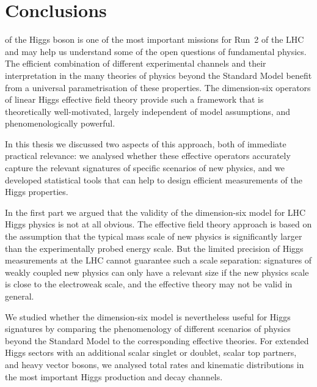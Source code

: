 
 
\chapter{Conclusions}
\label{chapter:conclusions}

 of the Higgs boson is one of
the most important missions for Run~2 of the LHC and may help us
understand some of the open questions of fundamental physics. The
efficient combination of different experimental channels and their
interpretation in the many theories of physics beyond the Standard Model
benefit from a universal parametrisation of these properties. The
dimension-six operators of linear Higgs effective field theory provide
such a framework that is theoretically well-motivated, largely
independent of model assumptions, and phenomenologically powerful.

In this thesis we discussed two aspects of this approach, both of
immediate practical relevance: we analysed whether these effective
operators accurately capture the relevant signatures of specific
scenarios of new physics, and we developed statistical tools that can
help to design efficient measurements of the Higgs properties.

\newparagraph
%
In the first part we argued that the validity of the dimension-six
model for LHC Higgs physics is not at all obvious. The
effective field theory approach is based on the assumption that the
typical mass scale of new physics is significantly larger than the
experimentally probed energy scale. But the limited precision of Higgs
measurements at the LHC cannot guarantee such a scale separation:
signatures of weakly coupled new physics can only have a relevant size
if the new physics scale is close to the electroweak scale, and the
effective theory may not be valid in general.

We studied whether the dimension-six model is nevertheless useful for
Higgs signatures
by comparing the phenomenology of different scenarios of physics
beyond the Standard Model to the corresponding effective theories. For
extended Higgs sectors with an additional scalar singlet or doublet,
scalar top partners, and heavy vector bosons, we analysed total rates
and kinematic distributions in the most important Higgs production and
decay channels.

